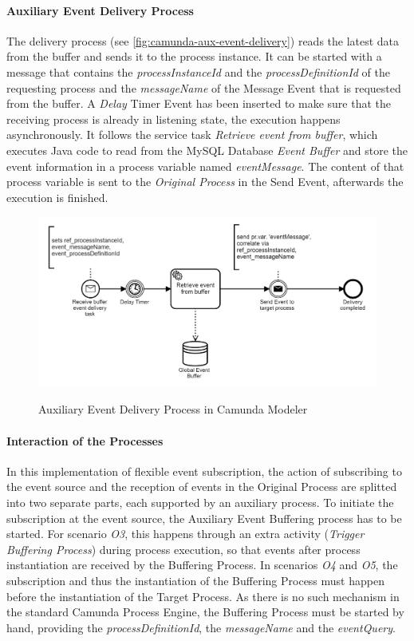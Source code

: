 \paragraph{Auxiliary Event Delivery Process}
The delivery process (see \autoref{fig:camunda-aux-event-delivery}) reads the latest data from the buffer and sends it to the process instance. It can be started with a message that contains the \textit{processInstanceId} and the \textit{processDefinitionId} of the requesting process and the \textit{messageName} of the Message Event that is requested from the buffer.
A \textit{Delay} Timer Event has been inserted to make sure that the receiving process is already in listening state, the execution happens asynchronously.
It follows the service task \textit{Retrieve event from buffer}, which executes Java code to read from the MySQL Database \textit{Event Buffer} and store the event information in a process variable named \textit{eventMessage}.
The content of that process variable is sent to the \textit{Original Process} in the Send Event, afterwards the execution is finished.


\begin{figure}[]
	\myfloatalign
	{\includegraphics[width=1\linewidth]{chapters/assessment/buffer-delivery-process.PNG}}
	\caption{Auxiliary Event Delivery Process in Camunda Modeler}\label{fig:camunda-aux-event-delivery}
\end{figure}


\paragraph{Interaction of the Processes}
In this implementation of flexible event subscription, the action of subscribing to the event source and the reception of events in the Original Process are splitted into two separate parts, each supported by an auxiliary process.
To initiate the subscription at the event source, the Auxiliary Event Buffering process has to be started.
For scenario \textit{O3}, this happens through an extra activity (\textit{Trigger Buffering Process}) during process execution, so that events after process instantiation are received by the Buffering Process.
In scenarios \textit{O4} and \textit{O5}, the subscription and thus the instantiation of the Buffering Process must happen before the instantiation of the Target Process. As there is no such mechanism in the standard Camunda Process Engine, the Buffering Process must be started by hand, providing the \textit{processDefinitionId}, the \textit{messageName} and the \textit{eventQuery}.

